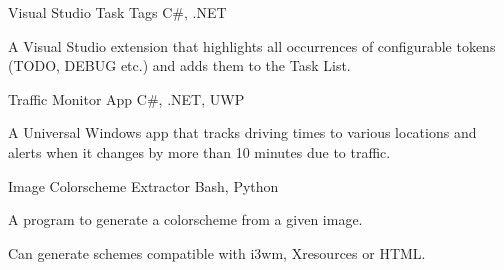 \begin{projentries}
\projentry%
  {Visual Studio Task Tags} %
  {C\#, .NET} %
  {} %
  {%
    \begin{projitems} %
      \item{A Visual Studio extension that highlights all occurrences of
            configurable tokens (TODO, DEBUG etc.) and adds them to the Task
            List.}
    \end{projitems}
  }

\projentry%
  {Traffic Monitor App} %
  {C\#, .NET, UWP} %
  {} %
  {%
    \begin{projitems} %
      \item{A Universal Windows app that tracks driving times to various
            locations and alerts when it changes by more than 10 minutes due
            to traffic.}
    \end{projitems}
  }

\projentry%
  {Image Colorscheme Extractor} %
  {Bash, Python} %
  {} %
  {%
    \begin{projitems} %
      \item{A program to generate a colorscheme from a given image.}
      \item{Can generate schemes compatible with i3wm, Xresources or HTML.}
    \end{projitems}
  }

\end{projentries}
